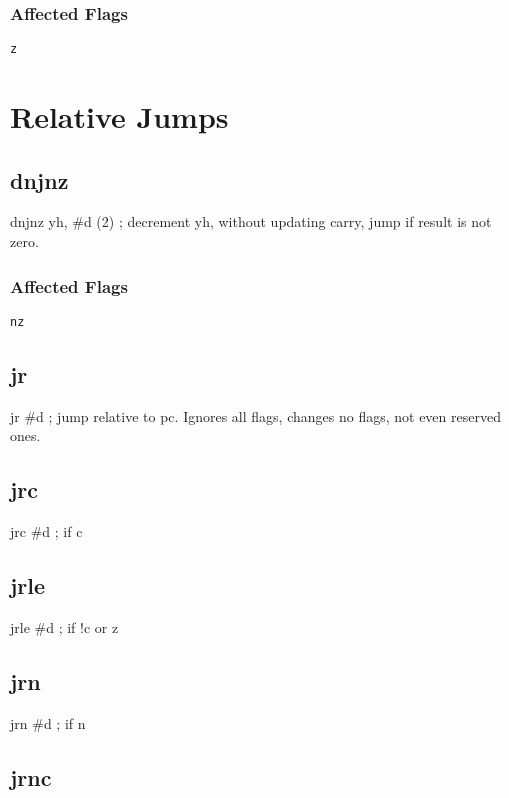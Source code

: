 \documentclass{book}
\begin{document}
\subsubsection*{Affected Flags}

\texttt{z}


\section{Relative Jumps}

\subsection{dnjnz}

dnjnz yh, \#d (2) ; decrement yh, without updating carry, jump if result is not zero.

\subsubsection*{Affected Flags}

\texttt{nz}


\subsection{jr}

jr \#d                 ; jump relative to pc. Ignores all flags, changes no flags, not even reserved ones.


\subsection{jrc}

jrc \#d                ; if c


\subsection{jrle}

jrle \#d               ; if !c or z


\subsection{jrn}

jrn \#d                ; if n


\subsection{jrnc}
\end{document}
